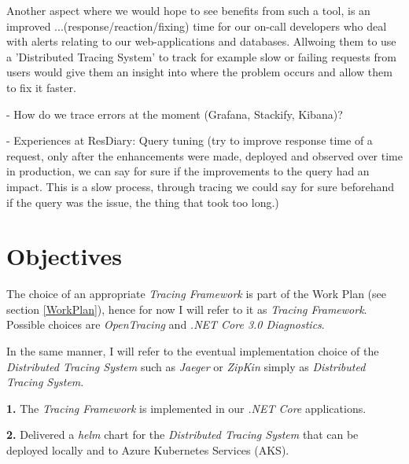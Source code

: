 \documentclass[11pt]{article}
\begin{document}
Another aspect where we would hope to see benefits from such a tool, is an improved ...(response/reaction/fixing) time for our on-call developers who deal with alerts relating to our web-applications and databases. Allwoing them to use a 'Distributed Tracing System' to track for example slow or failing requests from users would give them an insight into where the problem occurs and allow them to fix it faster.

- How do we trace errors at the moment (Grafana, Stackify, Kibana)?

- Experiences at ResDiary: Query tuning (try to improve response time of a request, only after the enhancements were made, deployed and observed over time in production, we can say for sure if the improvements to the query had an impact. This is a slow process, through tracing we could say for sure beforehand if the query was the issue, the thing that took too long.)

\section{Objectives} 


The choice of an appropriate \textit{Tracing Framework} is part of the Work Plan (see section \ref{WorkPlan}), hence for now I will refer to it as \textit{Tracing Framework}. Possible choices are \textit{OpenTracing} and \textit{.NET Core 3.0 Diagnostics}.

In the same manner, I will refer to the eventual implementation choice of the \textit{Distributed Tracing System} such as \textit{Jaeger} or \textit{ZipKin} simply as \textit{Distributed Tracing System}.

\textbf{1.} The \textit{Tracing Framework} is implemented in our \textit{.NET Core} applications.


\textbf{2.} Delivered a \textit{helm} chart for the \textit{Distributed Tracing System} that can be deployed locally and to Azure Kubernetes Services (AKS).
\end{document}
